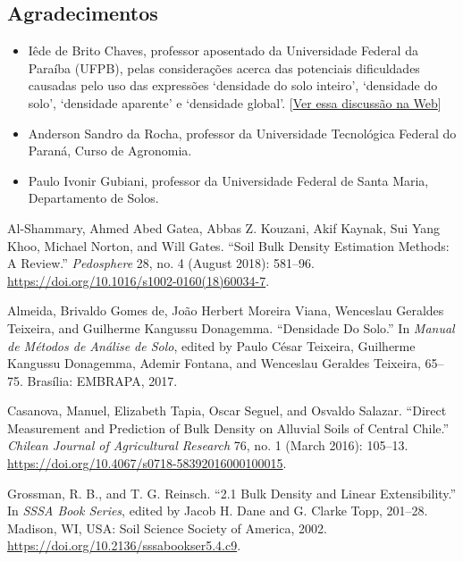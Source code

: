 \documentclass[a4paper,dvipsnames]{tufte-book}
\providecommand{\tightlist}{%
  \setlength{\itemsep}{0pt}\setlength{\parskip}{0pt}}
\begin{document}
\subsection{Agradecimentos}\label{agradecimentos}

\begin{itemize}
\tightlist
\item
  Iêde de Brito Chaves, professor aposentado da Universidade Federal da
  Paraíba (UFPB), pelas considerações acerca das potenciais dificuldades
  causadas pelo uso das expressões `densidade do solo inteiro',
  `densidade do solo', `densidade aparente' e `densidade global'.
  {[}\href{https://groups.google.com/d/msgid/soil-mapping/7c8745ca-243d-4d15-97cc-2d00cb5eefdd\%40googlegroups.com}{Ver
  essa discussão na Web}{]}
\item
  Anderson Sandro da Rocha, professor da Universidade Tecnológica
  Federal do Paraná, Curso de Agronomia.
\item
  Paulo Ivonir Gubiani, professor da Universidade Federal de Santa
  Maria, Departamento de Solos.
\end{itemize}

\hypertarget{refs}{}
\hypertarget{ref-Al-ShammaryEtAl2018}{}
Al-Shammary, Ahmed Abed Gatea, Abbas Z. Kouzani, Akif Kaynak, Sui Yang
Khoo, Michael Norton, and Will Gates. ``Soil Bulk Density Estimation
Methods: A Review.'' \emph{Pedosphere} 28, no. 4 (August 2018): 581--96.
\url{https://doi.org/10.1016/s1002-0160(18)60034-7}.

\hypertarget{ref-AlmeidaEtAl2017}{}
Almeida, Brivaldo Gomes de, João Herbert Moreira Viana, Wenceslau
Geraldes Teixeira, and Guilherme Kangussu Donagemma. ``Densidade Do
Solo.'' In \emph{Manual de Métodos de Análise de Solo}, edited by Paulo
César Teixeira, Guilherme Kangussu Donagemma, Ademir Fontana, and
Wenceslau Geraldes Teixeira, 65--75. Brasília: EMBRAPA, 2017.

\hypertarget{ref-CasanovaEtAl2016}{}
Casanova, Manuel, Elizabeth Tapia, Oscar Seguel, and Osvaldo Salazar.
``Direct Measurement and Prediction of Bulk Density on Alluvial Soils of
Central Chile.'' \emph{Chilean Journal of Agricultural Research} 76, no.
1 (March 2016): 105--13.
\url{https://doi.org/10.4067/s0718-58392016000100015}.

\hypertarget{ref-GrossmanEtAl2002}{}
Grossman, R. B., and T. G. Reinsch. ``2.1 Bulk Density and Linear
Extensibility.'' In \emph{SSSA Book Series}, edited by Jacob H. Dane and
G. Clarke Topp, 201--28. Madison, WI, USA: Soil Science Society of
America, 2002. \url{https://doi.org/10.2136/sssabookser5.4.c9}.
\end{document}
